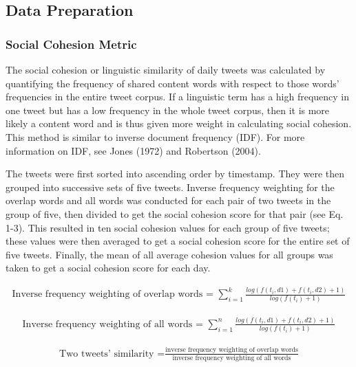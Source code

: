 \documentclass[
  english,
  man]{apa6}
\begin{document}
\hypertarget{data-preparation}{%
\subsection{Data Preparation}\label{data-preparation}}

\hypertarget{social-cohesion-metric}{%
\subsubsection{Social Cohesion Metric}\label{social-cohesion-metric}}

The social cohesion or linguistic similarity of daily tweets was calculated by
quantifying the frequency of shared content words with respect to those words'
frequencies in the entire tweet corpus. If a linguistic term has a high
frequency in one tweet but has a low frequency in the whole tweet corpus, then
it is more likely a content word and is thus given more weight in calculating
social cohesion. This method is similar to inverse document frequency (IDF). For
more information on IDF, see Jones (1972) and
Robertson (2004).

The tweets were first sorted into ascending order by timestamp. They were then
grouped into successive sets of five tweets. Inverse frequency weighting for the
overlap words and all words was conducted for each pair of two tweets in the
group of five, then divided to get the social cohesion score for that pair (see
Eq. 1-3). This resulted in ten social cohesion values for each group of five
tweets; these values were then averaged to get a social cohesion score for the
entire set of five tweets. Finally, the mean of all average cohesion values for
all groups was taken to get a social cohesion score for each day.

\begin{align}
\text{Inverse frequency weighting of overlap words = }\sum_{i=1}^k
\frac{log(f(t_i, d1) + f(t_i, d2) + 1)}{log(f(t_i) + 1)}
\end{align}

\begin{align}
\text{Inverse frequency weighting of all words = }\sum_{i=1}^n \frac{log(f(t_i,
d1) + f(t_i, d2) + 1)}{log(f(t_i) + 1)}
\end{align}

\begin{align}
\text{Two tweets' similarity =}\frac{\text{inverse frequency weighting of overlap
words}}{\text{inverse frequency weighting of all words}}
\end{align}
\end{document}

